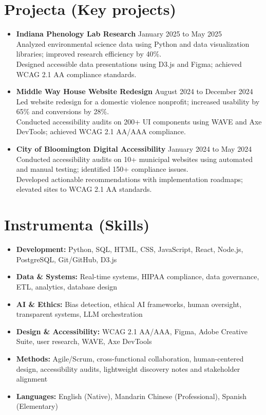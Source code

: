 \documentclass[11pt]{article}
\begin{document}
\section*{Projecta (Key projects)}
\begin{itemize}[leftmargin=*]
    \item \textbf{Indiana Phenology Lab Research} \hfill January 2025 to May 2025\\
    Analyzed environmental science data using Python and data visualization libraries; improved research efficiency by 40\%.\\
    Designed accessible data presentations using D3.js and Figma; achieved WCAG 2.1 AA compliance standards.

    \item \textbf{Middle Way House Website Redesign} \hfill August 2024 to December 2024\\
    Led website redesign for a domestic violence nonprofit; increased usability by 65\% and conversions by 28\%.\\
    Conducted accessibility audits on 200+ UI components using WAVE and Axe DevTools; achieved WCAG 2.1 AA/AAA compliance.

    \item \textbf{City of Bloomington Digital Accessibility} \hfill January 2024 to May 2024\\
    Conducted accessibility audits on 10+ municipal websites using automated and manual testing; identified 150+ compliance issues.\\
    Developed actionable recommendations with implementation roadmaps; elevated sites to WCAG 2.1 AA standards.
\end{itemize}

\section*{Instrumenta (Skills)}
\begin{itemize}[leftmargin=*]
    \item \textbf{Development:} Python, SQL, HTML, CSS, JavaScript, React, Node.js, PostgreSQL, Git/GitHub, D3.js
    \item \textbf{Data \& Systems:} Real-time systems, HIPAA compliance, data governance, ETL, analytics, database design
    \item \textbf{AI \& Ethics:} Bias detection, ethical AI frameworks, human oversight, transparent systems, LLM orchestration
    \item \textbf{Design \& Accessibility:} WCAG 2.1 AA/AAA, Figma, Adobe Creative Suite, user research, WAVE, Axe DevTools
    \item \textbf{Methods:} Agile/Scrum, cross-functional collaboration, human-centered design, accessibility audits, lightweight discovery notes and stakeholder alignment
    \item \textbf{Languages:} English (Native), Mandarin Chinese (Professional), Spanish (Elementary)
\end{itemize}
\end{document}
